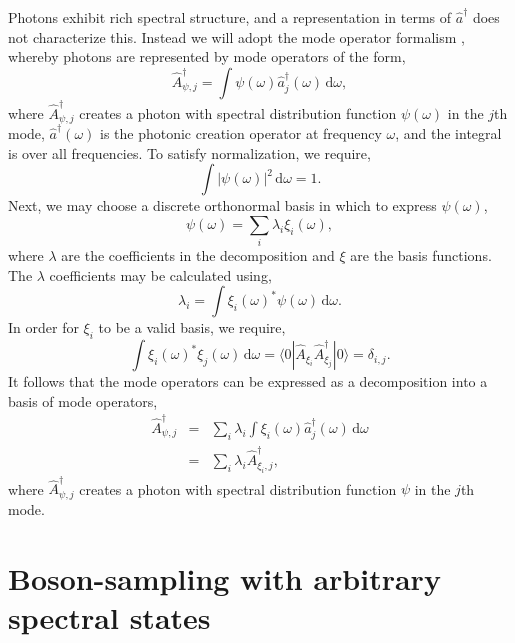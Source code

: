 \documentclass[aps,pra,twocolumn,amsmath,amssymb,nofootinbib,superscriptaddress]{revtex4}
\newcommand{\bra}[1]{\langle#1|}
\newcommand{\ket}[1]{|#1\rangle}
\begin{document}
Photons exhibit rich spectral structure, and a representation in terms of \mbox{$\hat{a}^\dag$} does not characterize this. Instead we will adopt the mode operator formalism \cite{bib:RohdeMauererSilberhorn07}, whereby photons are represented by mode operators of the form,
\begin{equation}
\hat{A}_{\psi,j}^\dag = \int \psi(\omega) \hat{a}_j^\dag(\omega)\, \mathrm{d}\omega,
\end{equation}
where \mbox{$\hat{A}_{\psi,j}^\dag$} creates a photon with spectral distribution function \mbox{$\psi(\omega)$} in the $j$th mode, \mbox{$\hat{a}^\dag(\omega)$} is the photonic creation operator at frequency $\omega$, and the integral is over all frequencies. To satisfy normalization, we require,
\begin{equation}
\int |\psi(\omega)|^2 \,\mathrm{d}\omega = 1.
\end{equation}
Next, we may choose a discrete orthonormal basis in which to express \mbox{$\psi(\omega)$},
\begin{equation}
\psi(\omega) = \sum_i \lambda_i \xi_i(\omega),
\end{equation}
where $\lambda$ are the coefficients in the decomposition and $\xi$ are the basis functions. The $\lambda$ coefficients may be calculated using,
\begin{equation}
\lambda_i = \int \xi_i(\omega)^* \psi(\omega)\, \mathrm{d}\omega.
\end{equation}
In order for $\xi_i$ to be a valid basis, we require,
\begin{equation} \label{eq:orthonormality}
\int \xi_i(\omega)^*\xi_j(\omega)\,\mathrm{d}\omega = \bra{0} \hat{A}_{\xi_i} \hat{A}_{\xi_j}^\dag \ket{0} = \delta_{i,j}.
\end{equation}
It follows that the mode operators can be expressed as a decomposition into a basis of mode operators,
\begin{eqnarray}
\hat{A}_{\psi,j}^\dag &=& \sum_i \lambda_i \int \xi_i(\omega) \hat{a}_j^\dag(\omega)\, \mathrm{d}\omega \nonumber \\
&=& \sum_i \lambda_i \hat{A}_{\xi_i,j}^\dag,
\end{eqnarray}
where \mbox{$\hat{A}_{\psi,j}^\dag$} creates a photon with spectral distribution function $\psi$ in the $j$th mode.

%
%

\section{Boson-sampling with arbitrary spectral states}
\end{document}
